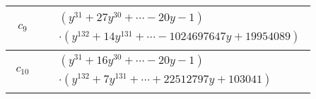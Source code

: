 \documentclass[1p]{elsarticle_modified}
\theoremstyle{definition}
\begin{document}
\begin{tabular}{m{50pt}|m{274pt}}
\hline $$\begin{aligned}c_{9}\end{aligned}$$&$\begin{aligned}
&(y^{31}+27 y^{30}+\cdots-20 y-1)\\
&\cdot(y^{132}+14 y^{131}+\cdots-1024697647 y+19954089)
\end{aligned}$\\
\hline $$\begin{aligned}c_{10}\end{aligned}$$&$\begin{aligned}
&(y^{31}+16 y^{30}+\cdots-20 y-1)\\
&\cdot(y^{132}+7 y^{131}+\cdots+22512797 y+103041)
\end{aligned}$\\
\hline
\end{tabular}
\vskip 2pc
\end{document}
